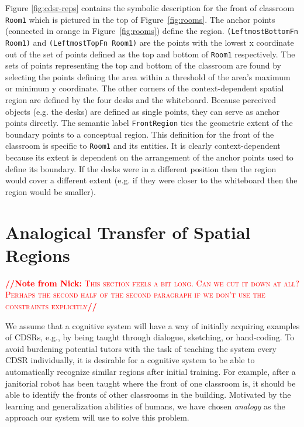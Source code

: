 \documentclass[letterpaper]{article}
\newcommand{\from}[2]{\textcolor{red}{\noindent\textbf{//}\textbf{Note
      from #1:}\textsc{ #2}\textbf{//}}}
\newcommand{\fw}[1]{\texttt{#1}}
\begin{document}
Figure \ref{fig:cdsr-reps} contains the symbolic description for the front of classroom \fw{Room1} which is pictured in the top of Figure~\ref{fig:rooms}. The anchor points (connected in orange in Figure~\ref{fig:rooms}) define the region. \fw{(LeftmostBottomFn Room1)} and \fw{(LeftmostTopFn Room1)} are the points with the lowest x coordinate out of the set of points defined as the top and bottom of \fw{Room1} respectively. The sets of points representing the top and bottom of the classroom are found by selecting the points defining the area within a threshold of the area's maximum or minimum y coordinate. The other corners of the context-dependent spatial region are defined by the four desks and the whiteboard. Because perceived objects (e.g. the desks) are defined as single points, they can serve as anchor points directly. The semantic label \fw{FrontRegion} ties the geometric extent of the boundary points to a conceptual region. This definition for the front of the classroom is specific to \fw{Room1} and its entities. It is clearly context-dependent because its extent is dependent on the arrangement of the anchor points used to define its boundary. If the desks were in a different position then the region would cover a different extent (e.g. if they were closer to the whiteboard then the region would be smaller). 



\section{Analogical Transfer of Spatial Regions}\label{sec:analogy}

\from{Nick}{This section feels a bit long. Can we cut it down at all? Perhaps the second half of the second paragraph if we don't use the constraints explicitly}

We assume that a cognitive system will have a way of initially acquiring examples of CDSRs, e.g., by being taught through dialogue, sketching, or hand-coding. To avoid burdening potential tutors with the task of teaching the system every CDSR individually, it is desirable for a cognitive system to be able to automatically recognize similar regions after initial training. For example, after a janitorial robot has been taught where the front of one classroom is, it should be able to identify the fronts of other classrooms in the building. Motivated by the learning and generalization abilities of humans, we have chosen \emph{analogy} as the approach our system will use to solve this problem.
\end{document}
